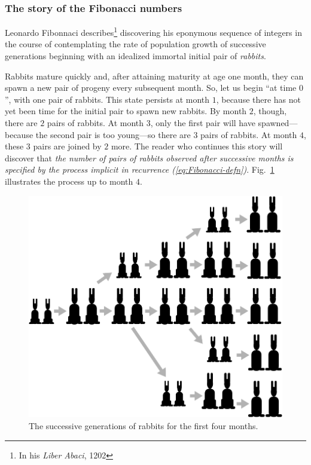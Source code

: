 \subsubsection{The story of the Fibonacci numbers}
\label{sec:Fibonacci-story}

Leonardo Fibonnaci describes\footnote{In his {\it Liber Abaci}, 1202} discovering his eponymous sequence of integers in the course of contemplating the rate of population growth of successive generations beginning with an idealized immortal initial pair of {\it rabbits}.

\smallskip

Rabbits mature quickly and, after attaining maturity at age one month, they can spawn a new pair of progeny every subsequent month.  So, let us begin ``at time $0$'', with one pair of rabbits.  This state persists at month $1$, because there has not yet been time for the initial pair to spawn new rabbits.  By month $2$, though, there are $2$ pairs of rabbits.  At month $3$, only the first pair will have spawned---because the second pair is too young---so there are $3$ pairs of rabbits.  At month $4$, these $3$ pairs are joined by $2$ more.  The reader who continues this story will discover that {\em the number of pairs of rabbits observed after successive months is specified by the process implicit in recurrence (\ref{eq:Fibonacci-defn})}.  Fig.~\ref{fig:fibo5} illustrates the process up to month $4$.
\begin{figure}[htb]
\begin{center}
        \includegraphics[scale=0.275]{FiguresMaths//Fibo5}
\caption{The successive generations of rabbits for the first four months.}
        \label{fig:fibo5}
\end{center}
\end{figure}

